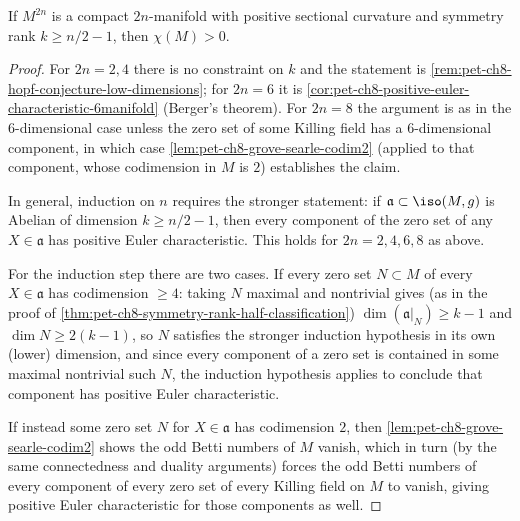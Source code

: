 \begin{theorem}
  \label{thm:pet-ch8-puttmann-searle-rong}
  If $M^{2n}$ is a compact $2n$-manifold with positive sectional curvature and
  symmetry rank $k\ge n/2-1$, then $\chi(M)>0$.
\end{theorem}
\begin{proof}
  For $2n=2,4$ there is no constraint on $k$ and the statement is
  \cref{rem:pet-ch8-hopf-conjecture-low-dimensions}; for $2n=6$ it is
  \cref{cor:pet-ch8-positive-euler-characteristic-6manifold} (Berger's
  theorem). For $2n=8$ the argument is as in the $6$-dimensional case unless
  the zero set of some Killing field has a $6$-dimensional component, in which
  case \cref{lem:pet-ch8-grove-searle-codim2} (applied to that component, whose
  codimension in $M$ is $2$) establishes the claim.

  In general, induction on $n$ requires the stronger statement: if
  $\mathfrak a\subset\iso(M,g)$ is Abelian of dimension $k\ge n/2-1$, then every
  component of the zero set of any $X\in\mathfrak a$ has positive Euler
  characteristic. This holds for $2n=2,4,6,8$ as above.

  For the induction step there are two cases. If every zero set $N\subset M$ of
  every $X\in\mathfrak a$ has codimension $\ge4$: taking $N$ maximal and
  nontrivial gives (as in the proof of
  \cref{thm:pet-ch8-symmetry-rank-half-classification}) $\dim(\mathfrak a|_N)\ge k-1$
  and $\dim N\ge2(k-1)$, so $N$ satisfies the stronger induction hypothesis in
  its own (lower) dimension, and since every component of a zero set is
  contained in some maximal nontrivial such $N$, the induction hypothesis
  applies to conclude that component has positive Euler characteristic.

  If instead some zero set $N$ for $X\in\mathfrak a$ has codimension $2$, then
  \cref{lem:pet-ch8-grove-searle-codim2} shows the odd Betti numbers of $M$
  vanish, which in turn (by the same connectedness and duality arguments)
  forces the odd Betti numbers of every component of every zero set of every
  Killing field on $M$ to vanish, giving positive Euler characteristic for
  those components as well.
\end{proof}


